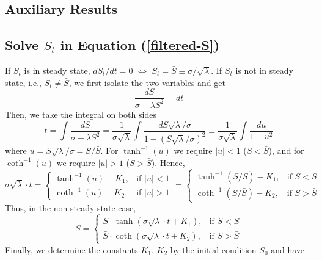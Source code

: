 \documentclass[mnsc]{informs3}
\begin{document}
\begin{APPENDICES}
\section{Auxiliary Results}

\subsection{Solve $S_t$ in Equation (\ref{filtered-S})}\label{app-S-equ}

If $S_t$ is in steady state, $dS_t/dt = 0$ $\Leftrightarrow$ $S_t = \bar{S} \equiv \sigma/\sqrt{\lambda}$.
If $S_t$ is not in steady state, i.e., $S_t\neq\bar{S}$, we first isolate the two variables and get
\begin{equation*}
	\frac{dS}{\sigma-\lambda S^2} = dt
\end{equation*}
Then, we take the integral on both sides
\begin{equation*}
    t = \int \frac{dS}{\sigma-\lambda S^2} = \frac{1}{\sigma\sqrt{\lambda}} \int \frac{dS\sqrt{\lambda}/\sigma}{1 - (S\sqrt{\lambda}/\sigma)^2} \equiv \frac{1}{\sigma\sqrt{\lambda}}\int \frac{du}{1-u^2}
\end{equation*}
where $u = S\sqrt{\lambda}/\sigma = S/\bar{S}$.
For $\tanh^{-1}(u)$ we require $|u|<1$ ($S<\bar S$), and for $\coth^{-1}(u)$ we require $|u|>1$ ($S>\bar S$).
Hence,
\begin{equation*}
    \sigma\sqrt{\lambda}\cdot t = \begin{cases}
        \tanh^{-1}(u)-K_1, & \text{if } |u|<1\\
        \coth^{-1}(u)-K_2, & \text{if } |u|>1
    \end{cases} = \begin{cases}
        \tanh^{-1}(S/\bar{S})-K_1, & \text{if } S<\bar{S}\\
        \coth^{-1}(S/\bar{S})-K_2, & \text{if } S>\bar{S}
\end{cases}
\end{equation*}
Thus, in the non-steady-state case,
\begin{equation*}
	S = \begin{cases}
		\bar{S}\cdot\tanh(\sigma\sqrt{\lambda}\cdot t + K_1), & \text{if } S<\bar{S}\\
		\bar{S}\cdot\coth(\sigma\sqrt{\lambda}\cdot t + K_2), & \text{if } S>\bar{S}
	\end{cases}
\end{equation*}
Finally, we determine the constants $K_1$, $K_2$ by the initial condition $S_0$ and have
\begin{align*}

\end{align*}
\end{APPENDICES}
\end{document}
